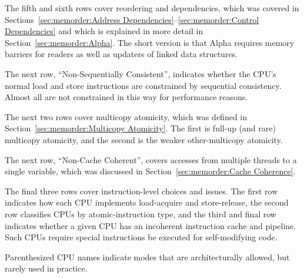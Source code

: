 The fifth and sixth rows cover reordering and dependencies,
which was covered in
Sections~\ref{sec:memorder:Address Dependencies}--\ref{sec:memorder:Control Dependencies}
and which is explained in more detail in
Section~\ref{sec:memorder:Alpha}.
The short version is that Alpha requires memory barriers for readers
as well as updaters of linked data structures.

The next row, ``Non-Sequentially Consistent'', indicates whether
the CPU's normal load and store instructions are constrained by
sequential consistency.
Almost all are not constrained in this way for performance reasons.

The next two rows cover multicopy atomicity, which was defined in
Section~\ref{sec:memorder:Multicopy Atomicity}.
The first is full-up (and rare) multicopy atomicity, and the second is the
weaker other-multicopy atomicity.

The next row, ``Non-Cache Coherent'', covers accesses from multiple
threads to a single variable, which was discussed in
Section~\ref{sec:memorder:Cache Coherence}.

The final three rows cover instruction-level choices and issues.
The first row indicates how each CPU implements load-acquire
and store-release, the second row classifies CPUs by atomic-instruction
type, and the third and final row
indicates whether a given CPU has an incoherent
instruction cache and pipeline.
Such CPUs require special instructions be executed for self-modifying
code.

Parenthesized CPU names indicate modes that are architecturally allowed,
but rarely used in practice.

